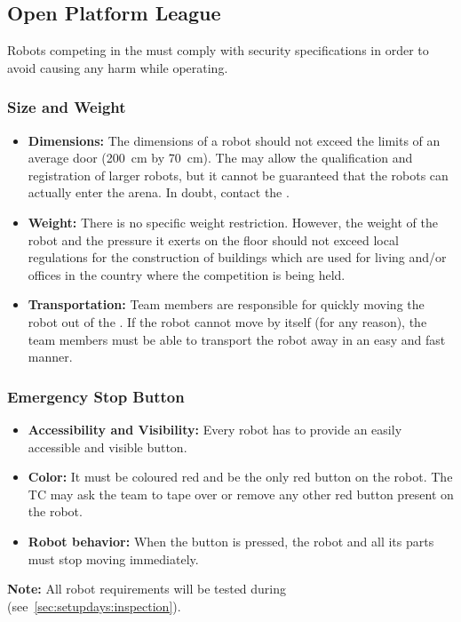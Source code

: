 \subsection{Open Platform League}
\label{sec:rules:robotappearance_opl}
Robots competing in the \OPL{} must comply with security specifications in order to avoid causing any harm while operating.

\subsubsection{Size and Weight}
\label{sec:rules:robotappearance_opl:size}

\begin{itemize}
	\item \textbf{Dimensions:} The dimensions of a robot should not exceed the limits of an average door (\SI{200}{\centi\meter} by \SI{70}{\centi\meter}). The \TC{} may allow the qualification and registration of larger robots, but it cannot be guaranteed that the robots can actually enter the arena. In doubt, contact the \LOC{}.
	\item \textbf{Weight:} There is no specific weight restriction. However, the weight of the robot and the pressure it exerts on the floor should not exceed local regulations for the construction of buildings which are used for living and/or offices in the country where the competition is being held.
	\item \textbf{Transportation:} Team members are responsible for quickly moving the robot out of the \Arena{}.	If the robot cannot move by itself (for any reason), the team members must be able to transport the robot away in an easy and fast manner.
\end{itemize}


\subsubsection{Emergency Stop Button}
\label{sec:rules:robotappearance_opl:esb}

\begin{itemize}
	\item \textbf{Accessibility and Visibility:} Every robot has to provide an easily accessible and visible \EmergencyStop{} button.
	\item \textbf{Color:} It must be coloured red and be the only red button on the robot.
	The TC may ask the team to tape over or remove any other red button present on the robot.
	\item \textbf{Robot behavior:} When the \EmergencyStop{} button is pressed, the robot and all its parts must stop moving immediately.
\end{itemize}


\noindent\textbf{Note:} All robot requirements will be tested during \RobotInspection{} (see~\ref{sec:setupdays:inspection}).